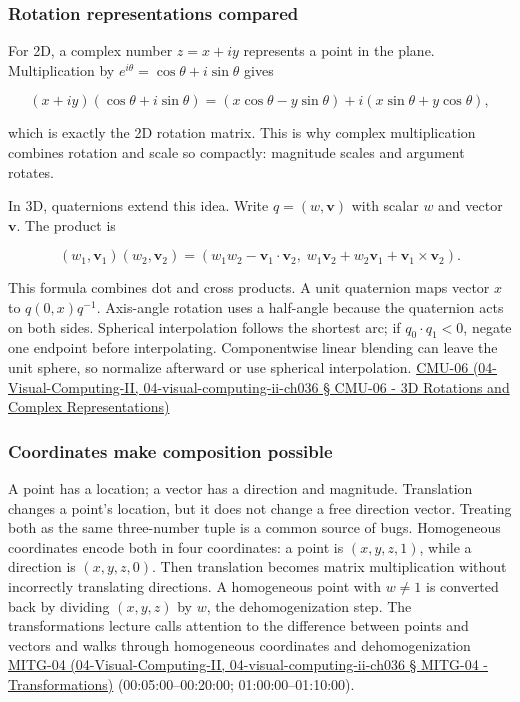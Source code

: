 \subsubsection{Rotation representations compared}\label{rotation-representations-compared}

For 2D, a complex number \(z=x+iy\) represents a point in the plane. Multiplication by \(e^{i\theta}=\cos\theta+i\sin\theta\) gives

\[
(x+iy)(\cos\theta+i\sin\theta)=(x\cos\theta-y\sin\theta)+i(x\sin\theta+y\cos\theta),
\]

which is exactly the 2D rotation matrix. This is why complex multiplication combines rotation and scale so compactly: magnitude scales and argument rotates.

In 3D, quaternions extend this idea. Write \(q=(w,\mathbf v)\) with scalar \(w\) and vector \(\mathbf v\). The product is

\[
(w_1,\mathbf v_1)(w_2,\mathbf v_2)=
(w_1w_2-\mathbf v_1\cdot\mathbf v_2,\;w_1\mathbf v_2+w_2\mathbf v_1+\mathbf v_1\times\mathbf v_2).
\]

This formula combines dot and cross products. A unit quaternion maps vector \(x\) to \(q(0,x)q^{-1}\). Axis-angle rotation uses a half-angle because the quaternion acts on both sides. Spherical interpolation follows the shortest arc; if \(q_0\cdot q_1<0\), negate one endpoint before interpolating. Componentwise linear blending can leave the unit sphere, so normalize afterward or use spherical interpolation. \href{}{CMU-06 (04-Visual-Computing-II, 04-visual-computing-ii-ch036 § CMU-06 - 3D Rotations and Complex Representations)}

\subsubsection{Coordinates make composition possible}\label{coordinates-make-composition-possible}

A point has a location; a vector has a direction and magnitude. Translation changes a point's location, but it does not change a free direction vector. Treating both as the same three-number tuple is a common source of bugs. Homogeneous coordinates encode both in four coordinates: a point is \((x,y,z,1)\), while a direction is \((x,y,z,0)\). Then translation becomes matrix multiplication without incorrectly translating directions. A homogeneous point with \(w\ne 1\) is converted back by dividing \((x,y,z)\) by \(w\), the dehomogenization step. The transformations lecture calls attention to the difference between points and vectors and walks through homogeneous coordinates and dehomogenization \href{}{MITG-04 (04-Visual-Computing-II, 04-visual-computing-ii-ch036 § MITG-04 - Transformations)} (00:05:00--00:20:00; 01:00:00--01:10:00).

